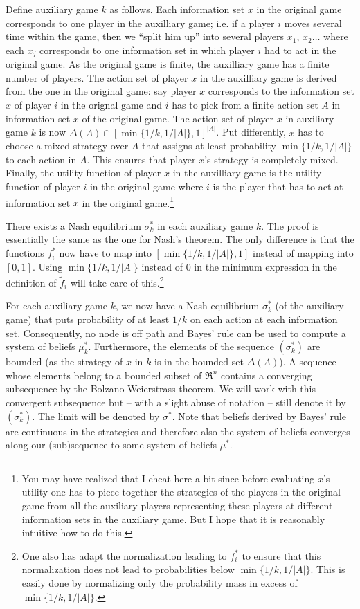 \documentclass[a4paper,11pt]{article}
\begin{document}
Define auxiliary game $k$ as follows. Each information set $x$ in the original game corresponds to one player in the auxilliary game; i.e. if a player $i$ moves several time within the game, then we ``split him up'' into several players $x_1,\, x_2\dots$ where each $x_j$ corresponds to one information set in which player $i$ had to act in the original game. As the original game is finite, the auxilliary game has a finite number of players. The action set of player $x$ in the auxilliary game is derived from the one in the original game: say player $x$ corresponds to the information set $x$ of player $i$ in the orignal game and $i$ has to pick from a finite action set $A$ in information set $x$ of the original game. The action set of player $x$ in auxiliary game $k$ is now $\Delta(A)\cap [\min\{1/k,1/|A|\},1]^{|A|}$. Put differently, $x$ has to choose a mixed strategy over $A$ that assigns at least probability $\min\{1/k,1/|A|\}$ to each action in $A$. This ensures that player $x$'s strategy is completely mixed. Finally, the utility function of player $x$ in the auxilliary game is the utility function of player $i$ in the original game where $i$ is the player that has to act at information set $x$ in the original game.\footnote{You may have realized that I cheat here a bit since before evaluating $x$'s utility one has to piece together the strategies of the players in the original game from all the auxiliary players representing these players at different information sets in the auxiliary game. But I hope that it is reasonably intuitive how to do this.}

There exists a Nash equilibrium $\sigma_k^*$ in each auxiliary game $k$. The proof is essentially the same as the one for Nash's theorem. The only difference is that the functions $f_i^*$ now have to map into $[\min\{1/k,1/|A|\},1]$ instead of mapping into $[0,1]$. Using $\min\{1/k,1/|A|\}$ instead of $0$ in the minimum expression in the  definition of $\tilde{f}_i$ will take care of this.\footnote{One also has adapt the normalization leading to $f_i^*$ to ensure that this normalization does not lead to probabilities below $\min\{1/k,1/|A|\}$. This is easily done by normalizing only the probability mass in excess of $\min\{1/k,1/|A|\}$. }

For each auxiliary game $k$, we now have a Nash equilibrium $\sigma_k^*$ (of the auxiliary game) that puts probability of at least $1/k$ on each action at each information set. Consequently, no node is off path and Bayes' rule can be used to compute a system of beliefs $\mu_k^*$. Furthermore, the elements of the sequence $(\sigma_k^*)$ are bounded (as the strategy of $x$ in $k$ is in the bounded set $\Delta(A)$). A sequence whose elements belong to a bounded subset of $\Re^n$ contains a converging subsequence by the Bolzano-Weierstrass theorem. We will work with this convergent subsequence but -- with a slight abuse of notation -- still denote it by $(\sigma_k^*) $. The limit will be denoted by $\sigma^*$. Note that beliefs derived by Bayes' rule are continuous in the strategies and therefore also the system of beliefs converges along our (sub)sequence to some system of beliefs $\mu^*$.
\end{document}
